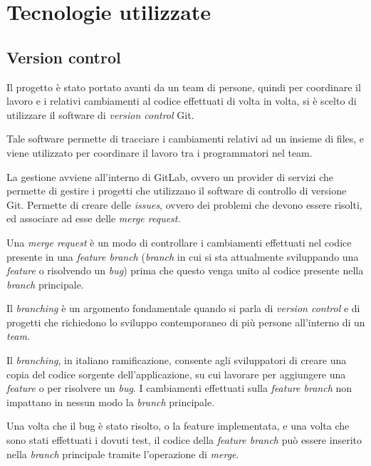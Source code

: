 \hypertarget{Tecnologie utilizzate}{%
\chapter{Tecnologie utilizzate}\label{tecnologie-utilizzate}}

\hypertarget{git-e-gitlab}{%
\section{Version control}\label{git-e-gitlab}}

Il progetto è stato portato avanti da un team di persone, quindi per coordinare il lavoro e i relativi cambiamenti al codice effettuati di volta in volta, si è scelto di utilizzare il software di \emph{version control} Git.

Tale software permette di tracciare i cambiamenti relativi ad un insieme di files, e viene utilizzato per coordinare il lavoro tra i programmatori nel team.

La gestione avviene all'interno di GitLab, ovvero  un provider di servizi che permette di gestire i progetti che utilizzano il software di controllo di versione Git. Permette di creare delle \emph{issues}, ovvero dei problemi che devono essere risolti, ed associare ad esse delle \emph{merge request.}

Una \emph{merge request} è un modo di controllare i cambiamenti effettuati nel codice presente in una \emph{feature branch} (\textit{branch} in cui si sta attualmente sviluppando una \textit{feature} o risolvendo un \textit{bug}) prima che questo venga unito al codice presente nella \emph{branch} principale.

Il \emph{branching} è un argomento fondamentale quando si parla di
\emph{version control} e di progetti che richiedono lo sviluppo contemporaneo di più persone all'interno di un \emph{team}.

Il \emph{branching}, in italiano ramificazione, consente agli sviluppatori di creare una copia del codice sorgente dell'applicazione, su cui lavorare per aggiungere una \emph{feature} o per risolvere un
\emph{bug}. I cambiamenti effettuati sulla \emph{feature branch} non impattano in nessun modo la \emph{branch} principale.

Una volta che il bug è stato risolto, o la feature implementata, e una volta che sono stati effettuati i dovuti test, il codice della
\emph{feature branch} può essere inserito nella \emph{branch} principale tramite l'operazione di \emph{merge}.

